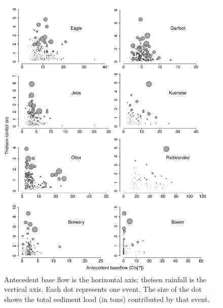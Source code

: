 \documentclass[10pt]{article}
\begin{document}
\begin{figure}
    \begin{center}
\includegraphics{loadings-figure4}
    \end{center}
    \caption{Antecedent base flow is the horizontal axis; theisen rainfall is the vertical axis. Each dot represents one event. The size of the dot shows the total sediment load (in tons) contributed by that event. \label{sed_bubbles}}
\end{figure}
\end{document}
